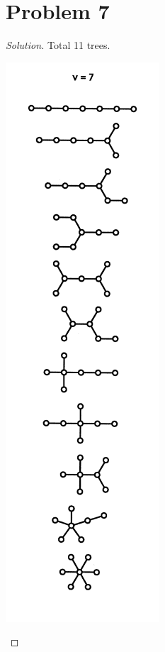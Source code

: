 \section*{Problem 7}
	\begin{proof} [Solution]
		Total 11 trees.\\
		\begin{center}
			\includegraphics[height=0.85\textheight]{iso7.png}
		\end{center}
	\end{proof}